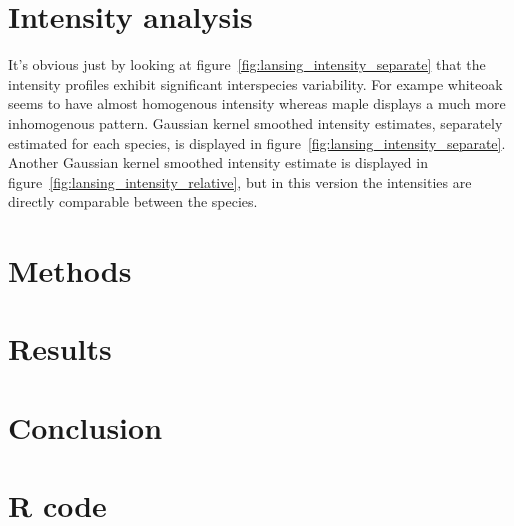 \documentclass[12pt,a4paper,oneside,article]{memoir}
\begin{document}
\section{Intensity analysis}
It's obvious just by looking at figure~\ref{fig:lansing_intensity_separate} that 
the intensity profiles exhibit significant interspecies variability. For exampe
whiteoak seems to have almost homogenous intensity whereas maple
displays a much more inhomogenous pattern. Gaussian kernel smoothed
intensity estimates, separately estimated for each species, is displayed in  
figure~\ref{fig:lansing_intensity_separate}. Another Gaussian kernel smoothed
 intensity estimate is displayed in figure~\ref{fig:lansing_intensity_relative},
 but in this version the intensities are directly comparable between the species.



\section{Methods}

\section{Results}

\section{Conclusion}


\printbibliography
\appendix
\section{R code}

%
%
\end{document}
